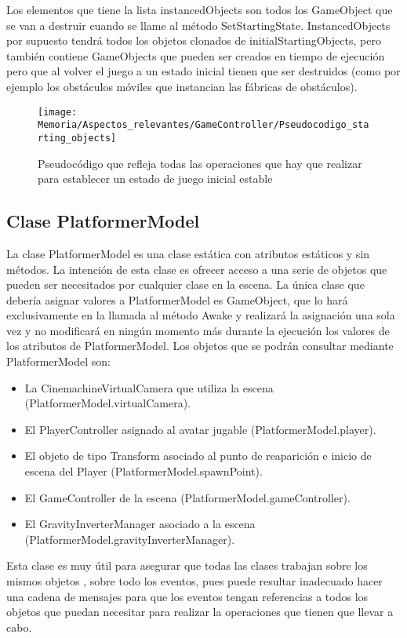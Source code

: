 Los elementos que tiene la lista instancedObjects son todos los GameObject que se van a destruir cuando se llame al método SetStartingState. InstancedObjects por supuesto tendrá todos los objetos clonados de initialStartingObjects, pero también contiene GameObjects que pueden ser creados en tiempo de ejecución pero que al volver el juego a un estado inicial tienen que ser destruidos (como por ejemplo los obstáculos móviles que instancian las fábricas de obstáculos).

\begin{figure}[h]
\texttt{[image: Memoria/Aspectos\_relevantes/GameController/Pseudocodigo\_starting\_objects]}
\caption{Pseudocódigo que refleja todas las operaciones que hay que realizar para establecer un estado de juego inicial estable}
\end{figure}

\subsection{Clase PlatformerModel}
La clase PlatformerModel es una clase estática con atributos estáticos y sin métodos. La intención de esta clase es ofrecer acceso a una serie de objetos que pueden ser necesitados por cualquier clase en la escena. La única clase que debería asignar valores a PlatformerModel es GameObject, que lo hará exclusivamente en la llamada al método Awake y realizará la asignación una sola vez y no modificará en ningún momento más durante la ejecución los valores de los atributos de PlatformerModel. Los objetos que se podrán consultar mediante PlatformerModel son:
\begin{itemize}
\item
La CinemachineVirtualCamera que utiliza la escena (PlatformerModel.virtualCamera).
\item
El PlayerController asignado al avatar jugable (PlatformerModel.player).
\item
El objeto de tipo Transform asociado al punto de reaparición e inicio de escena del Player (PlatformerModel.spawnPoint).
\item
El GameController de la escena (PlatformerModel.gameController).
\item
El GravityInverterManager asociado a la escena \\ (PlatformerModel.gravityInverterManager).
\end{itemize}
Esta clase es muy útil para asegurar que todas las clases trabajan sobre los mismos objetos , sobre todo los eventos, pues puede resultar inadecuado hacer una cadena de mensajes para que los eventos tengan referencias a todos los objetos que puedan necesitar para realizar la operaciones que tienen que llevar a cabo.

